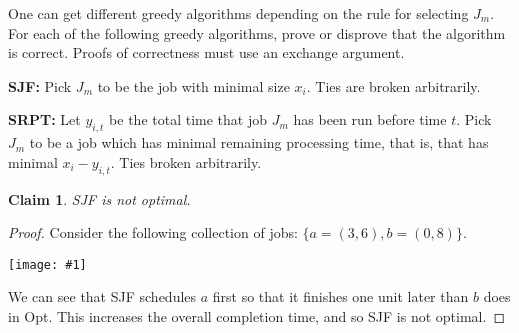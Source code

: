 \documentclass{article}
\newtheorem{thm}{Claim}
\providecommand{\image}[1]{
    \begin{center}
        \texttt{[image: \#1]}
    \end{center}
}
\begin{document}
    One can get different greedy algorithms depending on the rule for selecting $J_m$. 
    For each of the following greedy algorithms, prove or disprove that the algorithm is correct. 
    Proofs of correctness must use an exchange argument.
    
    \textbf{SJF:} Pick $J_m$ to be the job with minimal size $x_i$.
    Ties are broken arbitrarily.
    
    \textbf{SRPT:} Let $y_{i,t}$ be the total time that job $J_m$ has been run before time $t$.
    Pick $J_m$ to be a job which has minimal remaining processing time, that is, that has minimal $x_i - y_{i, t}$.
    Ties broken arbitrarily.
    
    
    \begin{thm}
        SJF is not optimal.
    \end{thm}
    \begin{proof}
        Consider the following collection of jobs: $\{ a=(3,6),b=(0,8) \}$.
        \image{p10atable}
        We can see that SJF schedules $a$ first so that it finishes one unit later than $b$ does in Opt.
        This increases the overall completion time, and so SJF is not optimal.
    \end{proof}
\end{document}
